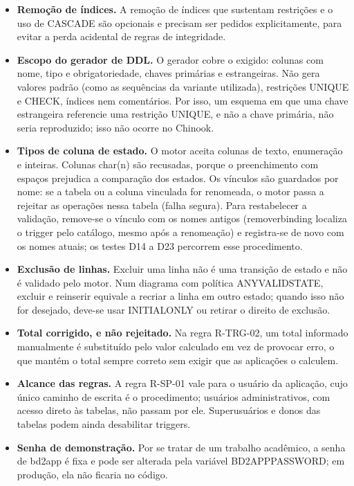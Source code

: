 \documentclass[11pt,a4paper]{article}
\newcommand{\cod}[1]{{\ttfamily\renewcommand{\_}{\textunderscore\allowbreak}#1}}
\begin{document}
\begin{itemize}
  \item \textbf{Remoção de índices.} A remoção de índices que sustentam restrições e o uso de \cod{CASCADE} são
        opcionais e precisam ser pedidos explicitamente, para evitar a perda acidental de regras de integridade.
  \item \textbf{Escopo do gerador de DDL.} O gerador cobre o exigido: colunas com nome, tipo e obrigatoriedade,
        chaves primárias e estrangeiras. Não gera valores padrão (como as sequências da variante utilizada),
        restrições \cod{UNIQUE} e \cod{CHECK}, índices nem comentários. Por isso, um esquema em que uma chave
        estrangeira referencie uma restrição \cod{UNIQUE}, e não a chave primária, não seria reproduzido; isso não
        ocorre no Chinook.
  \item \textbf{Tipos de coluna de estado.} O motor aceita colunas de texto, enumeração e inteiras. Colunas
        \cod{char(n)} são recusadas, porque o preenchimento com espaços prejudica a comparação dos estados. Os vínculos são
        guardados por nome: se a tabela ou a coluna vinculada for renomeada, o motor passa a rejeitar as operações
        nessa tabela (falha segura). Para restabelecer a validação, remove-se o vínculo com os nomes antigos
        (\cod{remover\_binding} localiza o trigger pelo catálogo, mesmo após a renomeação) e registra-se de novo com
        os nomes atuais; os testes D14 a D23 percorrem esse procedimento.
  \item \textbf{Exclusão de linhas.} Excluir uma linha não é uma transição de estado e não é validado pelo motor.
        Num diagrama com política \cod{ANY\_VALID\_STATE}, excluir e reinserir equivale a recriar a linha em outro
        estado; quando isso não for desejado, deve-se usar \cod{INITIAL\_ONLY} ou retirar o direito de exclusão.
  \item \textbf{Total corrigido, e não rejeitado.} Na regra R-TRG-02, um total informado manualmente é substituído
        pelo valor calculado em vez de provocar erro, o que mantém o total sempre correto sem exigir que as
        aplicações o calculem.
  \item \textbf{Alcance das regras.} A regra R-SP-01 vale para o usuário da aplicação, cujo único caminho de
        escrita é o procedimento; usuários administrativos, com acesso direto às tabelas, não passam por ele.
        Superusuários e donos das tabelas podem ainda desabilitar triggers.
  \item \textbf{Senha de demonstração.} Por se tratar de um trabalho acadêmico, a senha de \cod{bd2\_app} é fixa
        e pode ser alterada pela variável \cod{BD2\_APP\_PASSWORD}; em produção, ela não ficaria no código.
\end{itemize}
\end{document}
